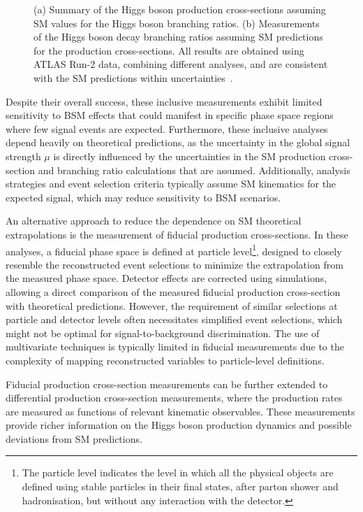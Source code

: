 \begin{figure}[htbp]
    \centering
    \hfill
    \caption{(a) Summary of the Higgs boson production cross-sections assuming SM values for the Higgs boson branching ratios. 
    (b) Measurements of the Higgs boson decay branching ratios assuming SM predictions for the production cross-sections. 
    All results are obtained using ATLAS Run-2 data, combining different analyses, and are consistent with the SM predictions within uncertainties~\cite{Nature_ATLAS}.}
    \label{fig:higgs_mu}
\end{figure}


Despite their overall success, these inclusive measurements exhibit limited sensitivity to BSM effects that could manifest in specific phase space regions where few signal events are expected. Furthermore, these inclusive analyses depend heavily on theoretical predictions, as the uncertainty in the global signal strength $\mu$ is directly influenced by the uncertainties in the SM production cross-section and branching ratio calculations that are assumed. Additionally, analysis strategies and event selection criteria typically assume SM kinematics for the expected signal, which may reduce sensitivity to BSM scenarios.

An alternative approach to reduce the dependence on SM theoretical extrapolations is the measurement of fiducial production cross-sections. In these analyses, a fiducial phase space is defined at particle level\footnote{The particle level indicates the level in which all the physical objects are defined using stable particles in their final states, after parton shower and hadronisation, but without any interaction with the detector.}, designed to closely resemble the reconstructed event selections to minimize the extrapolation from the measured phase space. Detector effects are corrected using simulations, allowing a direct comparison of the measured fiducial production cross-section with theoretical predictions. However, the requirement of similar selections at particle and detector levels often necessitates simplified event selections, which might not be optimal for signal-to-background discrimination. The use of multivariate techniques is typically limited in fiducial measurements due to the complexity of mapping reconstructed variables to particle-level definitions.

Fiducial production cross-section measurements can be further extended to differential production cross-section measurements, where the production rates are measured as functions of relevant kinematic observables. These measurements provide richer information on the Higgs boson production dynamics and possible deviations from SM predictions.

